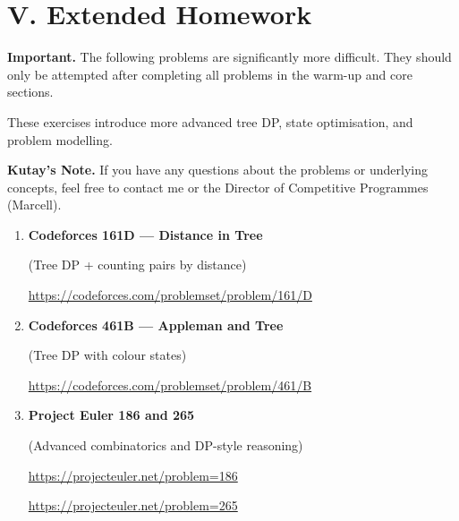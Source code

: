\documentclass[11pt]{article}
\begin{document}
\section*{V. Extended Homework}

\textbf{Important.} The following problems are significantly more difficult.  
They should only be attempted after completing all problems in the warm-up and
core sections.

These exercises introduce more advanced tree DP, state optimisation, and
problem modelling.

\medskip

\textbf{Kutay's Note.}  
If you have any questions about the problems or underlying concepts, feel free
to contact me or the Director of Competitive Programmes (Marcell).

\vspace{0.8em}

\begin{enumerate}

\item \textbf{Codeforces 161D --- Distance in Tree}

(Tree DP + counting pairs by distance)

\vspace{0.3em}
{\small\url{https://codeforces.com/problemset/problem/161/D}}

\vspace{0.8em}

\item \textbf{Codeforces 461B --- Appleman and Tree}

(Tree DP with colour states)

\vspace{0.3em}
{\small\url{https://codeforces.com/problemset/problem/461/B}}

\vspace{0.8em}

\item \textbf{Project Euler 186 and 265}

(Advanced combinatorics and DP-style reasoning)

\vspace{0.3em}
{\small\url{https://projecteuler.net/problem=186}}

\vspace{0.2em}
{\small\url{https://projecteuler.net/problem=265}}

\end{enumerate}
\end{document}
